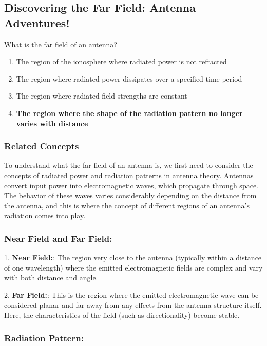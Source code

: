 \subsection{Discovering the Far Field: Antenna Adventures!}

\begin{tcolorbox}[colback=gray!10, colframe=black, title=E9B08] What is the far field of an antenna?
\begin{enumerate}[label=\Alph*.]
    \item The region of the ionosphere where radiated power is not refracted
    \item The region where radiated power dissipates over a specified time period
    \item The region where radiated field strengths are constant
    \item \textbf{The region where the shape of the radiation pattern no longer varies with distance}
\end{enumerate} \end{tcolorbox}

\subsubsection{Related Concepts}

To understand what the far field of an antenna is, we first need to consider the concepts of radiated power and radiation patterns in antenna theory. Antennas convert input power into electromagnetic waves, which propagate through space. The behavior of these waves varies considerably depending on the distance from the antenna, and this is where the concept of different regions of an antenna’s radiation comes into play.

\subsubsection*{Near Field and Far Field:}

1. \textbf{Near Field:}: The region very close to the antenna (typically within a distance of one wavelength) where the emitted electromagnetic fields are complex and vary with both distance and angle.
   
2. \textbf{Far Field:}: This is the region where the emitted electromagnetic wave can be considered planar and far away from any effects from the antenna structure itself. Here, the characteristics of the field (such as directionality) become stable.

\subsubsection*{Radiation Pattern:}

